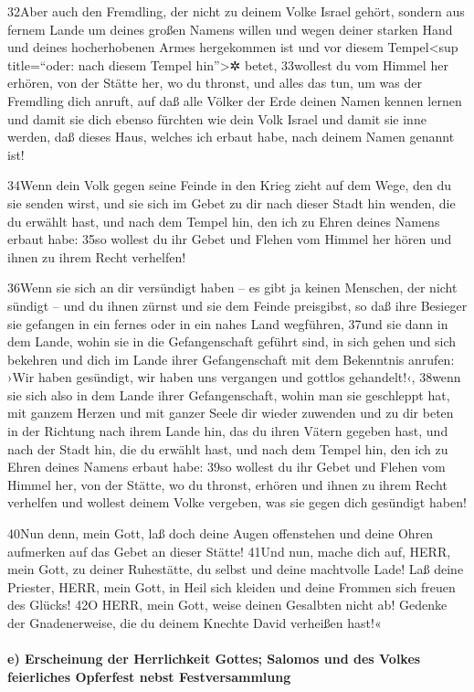 32Aber auch den Fremdling, der nicht zu deinem Volke Israel gehört,
sondern aus fernem Lande um deines großen Namens willen und wegen deiner
starken Hand und deines hocherhobenen Armes hergekommen ist und vor
diesem Tempel\textless sup title=``oder: nach diesem Tempel
hin''\textgreater✲ betet, 33wollest du vom Himmel her erhören, von der
Stätte her, wo du thronst, und alles das tun, um was der Fremdling dich
anruft, auf daß alle Völker der Erde deinen Namen kennen lernen und
damit sie dich ebenso fürchten wie dein Volk Israel und damit sie inne
werden, daß dieses Haus, welches ich erbaut habe, nach deinem Namen
genannt ist!

34Wenn dein Volk gegen seine Feinde in den Krieg zieht auf dem Wege, den
du sie senden wirst, und sie sich im Gebet zu dir nach dieser Stadt hin
wenden, die du erwählt hast, und nach dem Tempel hin, den ich zu Ehren
deines Namens erbaut habe: 35so wollest du ihr Gebet und Flehen vom
Himmel her hören und ihnen zu ihrem Recht verhelfen!

36Wenn sie sich an dir versündigt haben -- es gibt ja keinen Menschen,
der nicht sündigt -- und du ihnen zürnst und sie dem Feinde preisgibst,
so daß ihre Besieger sie gefangen in ein fernes oder in ein nahes Land
wegführen, 37und sie dann in dem Lande, wohin sie in die Gefangenschaft
geführt sind, in sich gehen und sich bekehren und dich im Lande ihrer
Gefangenschaft mit dem Bekenntnis anrufen: ›Wir haben gesündigt, wir
haben uns vergangen und gottlos gehandelt!‹, 38wenn sie sich also in dem
Lande ihrer Gefangenschaft, wohin man sie geschleppt hat, mit ganzem
Herzen und mit ganzer Seele dir wieder zuwenden und zu dir beten in der
Richtung nach ihrem Lande hin, das du ihren Vätern gegeben hast, und
nach der Stadt hin, die du erwählt hast, und nach dem Tempel hin, den
ich zu Ehren deines Namens erbaut habe: 39so wollest du ihr Gebet und
Flehen vom Himmel her, von der Stätte, wo du thronst, erhören und ihnen
zu ihrem Recht verhelfen und wollest deinem Volke vergeben, was sie
gegen dich gesündigt haben!

40Nun denn, mein Gott, laß doch deine Augen offenstehen und deine Ohren
aufmerken auf das Gebet an dieser Stätte! 41Und nun, mache dich auf,
HERR, mein Gott, zu deiner Ruhestätte, du selbst und deine machtvolle
Lade! Laß deine Priester, HERR, mein Gott, in Heil sich kleiden und
deine Frommen sich freuen des Glücks! 42O HERR, mein Gott, weise deinen
Gesalbten nicht ab! Gedenke der Gnadenerweise, die du deinem Knechte
David verheißen hast!«

\hypertarget{e-erscheinung-der-herrlichkeit-gottes-salomos-und-des-volkes-feierliches-opferfest-nebst-festversammlung}{%
\paragraph{e) Erscheinung der Herrlichkeit Gottes; Salomos und des
Volkes feierliches Opferfest nebst
Festversammlung}\label{e-erscheinung-der-herrlichkeit-gottes-salomos-und-des-volkes-feierliches-opferfest-nebst-festversammlung}}


